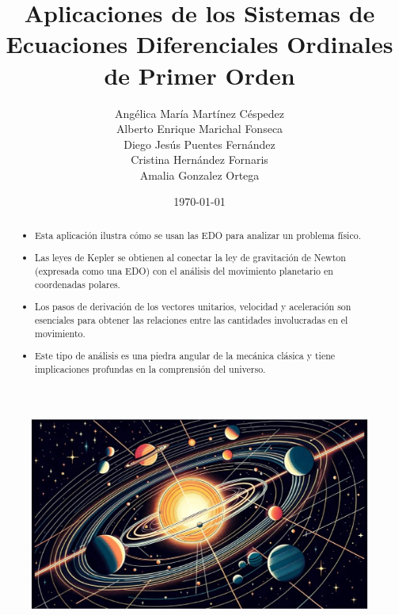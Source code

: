 \documentclass{article}
\begin{document}
	
	\title{\textbf{\huge Aplicaciones de los Sistemas de Ecuaciones Diferenciales Ordinales de Primer Orden}}
	
	\author{\Large Angélica María Martínez Céspedez \\
		\Large Alberto Enrique Marichal Fonseca \\
		\Large Diego Jesús Puentes Fernández \\
		\Large Cristina Hernández Fornaris\\
		\Large Amalia Gonzalez Ortega}
	\date{\today}
	
	\maketitle 
	
	\begin{figure}[H]
		\centering
		\includegraphics[width=0.5\linewidth]{portada}
		\label{fig:portada}
	\end{figure}
	
	\clearpage
	
	\begin{abstract}
		\begin{itemize}
			\item Esta aplicación ilustra cómo se usan las EDO para analizar un problema físico.
			
			\item Las leyes de Kepler se obtienen al conectar la ley de gravitación de Newton (expresada como una EDO) con el análisis del movimiento planetario en coordenadas polares.
			
			\item Los pasos de derivación de los vectores unitarios, velocidad y aceleración son esenciales para obtener las relaciones entre las cantidades involucradas en el movimiento.
			
			\item Este tipo de análisis es una piedra angular de la mecánica clásica y tiene implicaciones profundas en la comprensión del universo.
		\end{itemize}
	\end{abstract}
	
\end{document}
